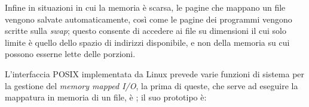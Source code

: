 Infine in situazioni in cui la memoria è scarsa, le pagine che mappano un file
vengono salvate automaticamente, così come le pagine dei programmi vengono
scritte sulla \textit{swap}; questo consente di accedere ai file su dimensioni
il cui solo limite è quello dello spazio di indirizzi disponibile, e non della
memoria su cui possono esserne lette delle porzioni.

L'interfaccia POSIX implementata da Linux prevede varie funzioni di sistema
per la gestione del \textit{memory mapped I/O}, la prima di queste, che serve
ad eseguire la mappatura in memoria di un file, è ; il suo
prototipo è:

\begin{funcproto}{
}


\end{funcproto}
